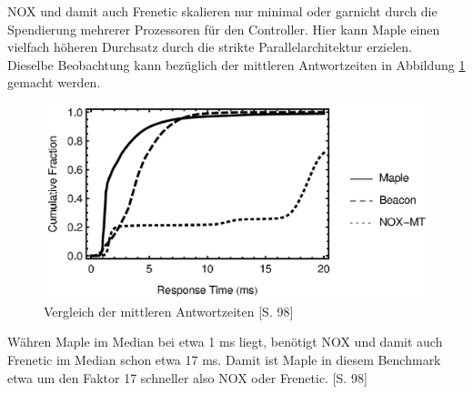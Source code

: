 \documentclass[10pt,conference]{IEEEtran}
\begin{document}
\newline
NOX und damit auch Frenetic skalieren nur minimal oder garnicht durch die Spendierung mehrerer Prozessoren für den Controller. Hier kann Maple einen vielfach höheren Durchsatz durch die strikte Parallelarchitektur erzielen.\\
Dieselbe Beobachtung kann bezüglich der mittleren Antwortzeiten in Abbildung \ref{fig:mapleResponseTime} gemacht werden.
\begin{figure}[h]
	\centering
	\includegraphics[width=\columnwidth]{images/mapleResponseTime.PNG}
	\caption{Vergleich der mittleren Antwortzeiten \cite{7}[S. 98]}
	\label{fig:mapleResponseTime}
\end{figure}
\newline
Währen Maple im Median bei etwa 1 ms liegt, benötigt NOX und damit auch Frenetic im Median schon etwa 17 ms. Damit ist Maple in diesem Benchmark etwa um den Faktor 17 schneller also NOX oder Frenetic. \cite{7}[S. 98]
\end{document}
